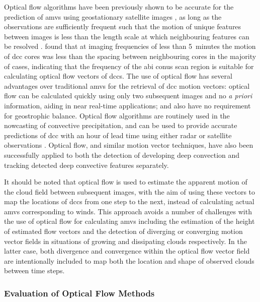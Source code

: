 Optical flow algorithms have been previously shown to be accurate for the prediction of \acrshort{amv}s using geostationary satellite images \citep{wu_deriving_2016}, as long as the observations are sufficiently frequent such that the motion of unique features between images is less than the length scale at which neighbouring features can be resolved \citep{bresky_feasibility_2006}.
\citet{heikenfeld_tobac_2019} found that at imaging frequencies of less than 5~minutes the motion of \acrshort{dcc} cores was less than the spacing between neighbouring cores in the majority of cases, indicating that the frequency of the \acrshort{abi} \acrshort{conus} scan region is suitable for calculating optical flow vectors of \acrshort{dcc}s.
The use of optical flow has several advantages over traditional \acrshort{amv}s for the retrieval of \acrshort{dcc} motion vectors: optical flow can be calculated quickly using only two subsequent images and no \textit{a priori} information, aiding in near real-time applications; and also have no requirement for geostrophic balance. 
Optical flow algorithms are routinely used in the nowcasting of convective precipitation, and can be used to provide accurate predictions of \acrshort{dcc} with an hour of lead time using either radar or satellite observations \citep[e.g.][]{bowler_development_2004, bechini_enhanced_2017, woo_operational_2017}.
Optical flow, and similar motion vector techniques, have also been successfully applied to both the detection of developing deep convection \citep{zinner_cb-tram_2008, zhang_locating_2014} and tracking detected deep convective features \citep{senf_size-resolved_2018} separately.

It should be noted that optical flow is used to estimate the apparent motion of the cloud field between subsequent images, with the aim of using these vectors to map the locations of \acrshort{dcc}s from one step to the next, instead of calculating actual \acrshort{amv}s corresponding to winds.
This approach avoids a number of challenges with the use of optical flow for calculating \acrshort{amv}s including the estimation of the height of estimated flow vectors and the detection of diverging or converging motion vector fields in situations of growing and dissipating clouds respectively.
In the latter case, both divergence and convergence within the optical flow vector field are intentionally included to map both the location and shape of observed clouds between time steps.

\subsubsection{Evaluation of Optical Flow Methods}

